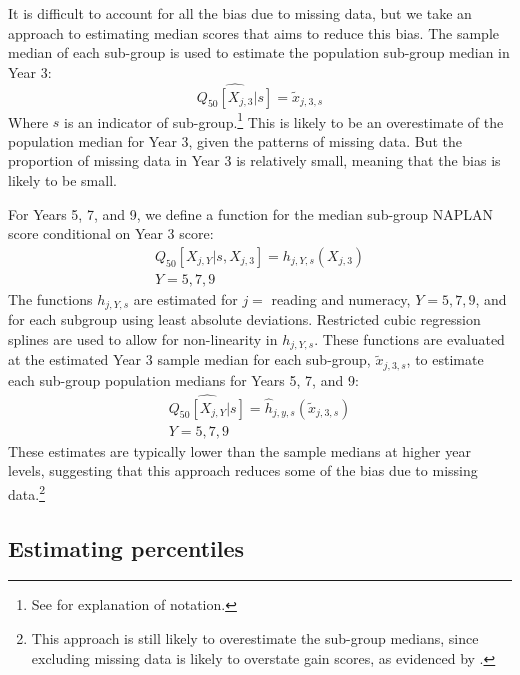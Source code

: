 It is difficult to account for all the bias due to missing data, but we take an approach to estimating median scores that aims to reduce this bias. The sample median of each sub-group is used to estimate the population sub-group median in Year 3:
\begin{equation}
\widehat{Q_{50}\left[X_{j,3}|s\right]} = \tilde{x}_{j,3,s}
\end{equation}
Where $s$ is an indicator of sub-group.\footnote{See  for explanation of notation.} This is likely to be an overestimate of the population median for Year 3, given the patterns of missing data. But the proportion of missing data in Year 3 is relatively small, meaning that the bias is likely to be small.

For Years 5, 7, and 9, we define a function for the median sub-group NAPLAN score conditional on Year 3 score:
\begin{equation} \begin{array}{c}
Q_{50}\left[X_{j,Y}|s,X_{j,3}\right] = h_{j,Y,s}\left(X_{j,3}\right) \\
Y = 5,7,9
\end{array} \end{equation}
The functions $h_{j,Y,s}$ are estimated for $j = $ reading and numeracy, $Y = 5, 7, 9$, and for each subgroup using least absolute deviations. Restricted cubic regression splines are used to allow for non-linearity in $h_{j,Y,s}$. These functions are evaluated at the estimated Year 3 sample median for each sub-group, $\tilde{x}_{j,3,s}$, to estimate each sub-group population medians for Years 5, 7, and 9:
\begin{equation} \begin{array}{c}
\widehat{Q_{50}\left[X_{j,Y}|s\right]} = \widehat{h}_{j,y,s}\left(\tilde{x}_{j,3,s}\right) \\
Y = 5,7,9
\end{array} \end{equation}
These estimates are typically lower than the sample medians at higher year levels, suggesting that this approach reduces some of the bias due to missing data.\footnote{This approach is still likely to overestimate the sub-group medians, since excluding missing data is likely to overstate gain scores, as evidenced by .}

\subsection{Estimating percentiles}


